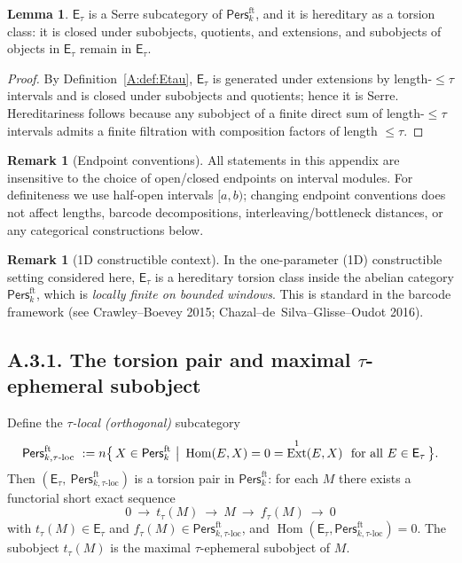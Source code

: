 \documentclass[11pt]{article}
\numberwithin{equation}{section}
\theoremstyle{plain}
\theoremstyle{definition}
\theoremstyle{remark}
\DeclareMathOperator{\Ext}{Ext}
\DeclareMathOperator{\Hom}{Hom}
\newcommand{\Pers}{\mathsf{Pers}}
\theoremstyle{plain}
\theoremstyle{definition}
\numberwithin{equation}{section}
\newtheorem{lemma}[theorem]{Lemma}
\theoremstyle{definition}
\newtheorem{remark}[theorem]{Remark}
\numberwithin{equation}{section}
\theoremstyle{plain}
\theoremstyle{definition}
\theoremstyle{remark}
\providecommand{\n}{\unskip\space}
\begin{document}
\begin{lemma}\label{A:lem:Serre}
\(\mathsf{E}_\tau\) is a Serre subcategory of \(\Pers^{\mathrm{ft}}_k\), and it is hereditary as a torsion class: it is closed under subobjects, quotients, and extensions, and subobjects of objects in \(\mathsf{E}_\tau\) remain in \(\mathsf{E}_\tau\).
\end{lemma}

\begin{proof}
By Definition~\ref{A:def:Etau}, \(\mathsf{E}_\tau\) is generated under extensions by length-\(\le\tau\) intervals and is closed under subobjects and quotients; hence it is Serre.
Hereditariness follows because any subobject of a finite direct sum of length-\(\le\tau\) intervals admits a finite filtration with composition factors of length \(\le\tau\).
\end{proof}

\begin{remark}[Endpoint conventions]\label{A:rk:endpoints}
All statements in this appendix are insensitive to the choice of open/closed endpoints on interval modules.
For definiteness we use half-open intervals \([a,b)\); changing endpoint conventions does not affect lengths, barcode decompositions, interleaving/bottleneck distances, or any categorical constructions below.
\end{remark}

\begin{remark}[1D constructible context]
In the one-parameter (1D) constructible setting considered here, \(\mathsf{E}_\tau\) is a hereditary torsion class inside the abelian category \(\Pers^{\mathrm{ft}}_k\), which is \emph{locally finite on bounded windows}.
This is standard in the barcode framework (see Crawley–Boevey 2015; Chazal–de~Silva–Glisse–Oudot 2016).
\end{remark}

\subsection*{A.3.1. The torsion pair and maximal \texorpdfstring{$\tau$}{tau}-ephemeral subobject}
Define the \emph{\(\tau\)-local (orthogonal)} subcategory
\[
\Pers^{\mathrm{ft}}_{k,\tau\text{-loc}}\n\ :=\\n\bigl\{\,X\in\Pers^{\mathrm{ft}}_k\ \big|\ \Hom(E,X)=0=\Ext^1(E,X)\ \text{ for all }E\in\mathsf{E}_\tau\,\bigr\}.
\]
Then \((\mathsf{E}_\tau,\ \Pers^{\mathrm{ft}}_{k,\tau\text{-loc}})\) is a torsion pair in \(\Pers^{\mathrm{ft}}_k\): for each \(M\) there exists a functorial short exact sequence
\[
0\ \longrightarrow\ t_\tau(M)\ \longrightarrow\ M\ \longrightarrow\ f_\tau(M)\ \longrightarrow\ 0
\]
with \(t_\tau(M)\in\mathsf{E}_\tau\) and \(f_\tau(M)\in \Pers^{\mathrm{ft}}_{k,\tau\text{-loc}}\), and \(\Hom(\mathsf{E}_\tau,\Pers^{\mathrm{ft}}_{k,\tau\text{-loc}})=0\).
The subobject \(t_\tau(M)\) is the maximal \(\tau\)-ephemeral subobject of \(M\).
\end{document}
